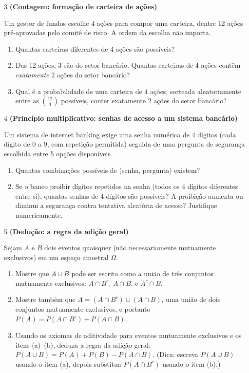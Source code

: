 \documentclass[11pt]{article}
\begin{document}
\begin{questao}{3} \textbf{(Contagem: formação de carteira de ações)}

Um gestor de fundos escolhe 4 ações para compor uma carteira, dentre 12 ações pré-aprovadas pelo
comitê de risco. A ordem da escolha não importa.

\begin{enumerate}[label=(\alph*)]
  \item Quantas carteiras diferentes de 4 ações são possíveis?
  \item Das 12 ações, 3 são do setor bancário. Quantas carteiras de 4 ações contêm \emph{exatamente}
    2 ações do setor bancário?
  \item Qual é a probabilidade de uma carteira de 4 ações, sorteada aleatoriamente entre as
    $\binom{12}{4}$ possíveis, conter exatamente 2 ações do setor bancário?
\end{enumerate}
\end{questao}

\begin{questao}{4} \textbf{(Princípio multiplicativo: senhas de acesso a um sistema bancário)}

Um sistema de internet banking exige uma senha numérica de 4 dígitos (cada dígito de 0 a 9, com
repetição permitida) seguida de uma pergunta de segurança escolhida entre 5 opções disponíveis.

\begin{enumerate}[label=(\alph*)]
  \item Quantas combinações possíveis de (senha, pergunta) existem?
  \item Se o banco proibir dígitos repetidos na senha (todos os 4 dígitos diferentes entre si),
    quantas senhas de 4 dígitos são possíveis? A proibição aumenta ou diminui a segurança contra
    tentativa aleatória de acesso? Justifique numericamente.
\end{enumerate}
\end{questao}

\begin{questao}{5} \textbf{(Dedução: a regra da adição geral)}

Sejam $A$ e $B$ dois eventos quaisquer (não necessariamente mutuamente exclusivos) em um espaço
amostral $\Omega$.

\begin{enumerate}[label=(\alph*)]
  \item Mostre que $A\cup B$ pode ser escrito como a união de três conjuntos mutuamente
    exclusivos: $A\cap B^c$, $A\cap B$, e $A^c\cap B$.
  \item Mostre também que $A = (A\cap B^c)\cup(A\cap B)$, uma união de dois conjuntos mutuamente
    exclusivos, e portanto $P(A) = P(A\cap B^c) + P(A\cap B)$.
  \item Usando os axiomas de aditividade para eventos mutuamente exclusivos e os itens (a)--(b),
    deduza a regra da adição geral: $P(A\cup B) = P(A) + P(B) - P(A\cap B)$. (Dica: escreva
    $P(A\cup B)$ usando o item (a), depois substitua $P(A\cap B^c)$ usando o item (b).)
\end{enumerate}
\end{questao}
\end{document}
